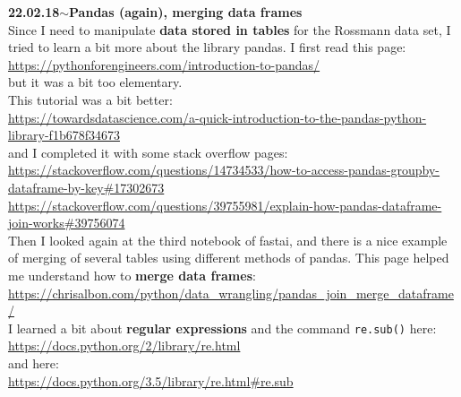 \documentclass[11pt,a4paper]{article}
\newenvironment{loggentry}[2]%
{\noindent\textbf{#1}\hspace{1cm}$\mathbf{\sim}$\text{ }\textbf{#2}\\}{\vspace{0.5cm}}
\begin{document}
\begin{loggentry}{22.02.18}{Pandas (again), merging data frames}
Since I need to manipulate \textbf{data stored in tables} for the Rossmann data set, I tried to learn a bit more about the library pandas. I first read this page:\\
\url{https://pythonforengineers.com/introduction-to-pandas/}\\
but it was a bit too elementary.\\
This tutorial was a bit better:\\
\url{https://towardsdatascience.com/a-quick-introduction-to-the-pandas-python-library-f1b678f34673}\\
and I completed it with some stack overflow pages:\\
\url{https://stackoverflow.com/questions/14734533/how-to-access-pandas-groupby-dataframe-by-key#17302673}\\
\url{https://stackoverflow.com/questions/39755981/explain-how-pandas-dataframe-join-works#39756074}\\
Then I looked again at the third notebook of fastai, and there is a nice example of merging of several tables using different methods of pandas. This page helped me understand how to \textbf{merge data frames}:\\
\url{https://chrisalbon.com/python/data_wrangling/pandas_join_merge_dataframe/}\\
I learned a bit about \textbf{regular expressions} and the command \texttt{re.sub()} here:\\
\url{https://docs.python.org/2/library/re.html}\\
and here:\\
\url{https://docs.python.org/3.5/library/re.html#re.sub}
\end{loggentry}
\end{document}
